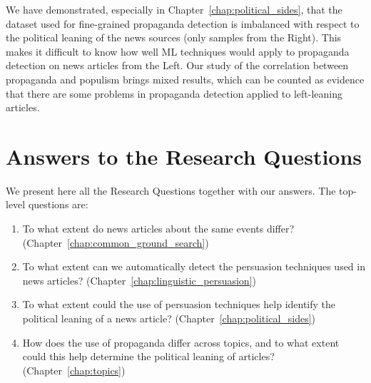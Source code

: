 \begin{enumerate}
          We have demonstrated, especially in Chapter~\ref{chap:political_sides}, that the dataset used for fine-grained propaganda detection is imbalanced with respect to the political leaning of the news sources (only samples from the Right). This makes it difficult to know how well ML techniques would apply to propaganda detection on news articles from the Left. Our study of the correlation between propaganda and populism brings mixed results, which can be counted as evidence that there are some problems in propaganda detection applied to left-leaning articles.
\end{enumerate}


\section{\statusgreen Answers to the Research Questions}
\label{sec:discussion_answers}

We present here all the Research Questions together with our answers. The top-level questions are:

\begin{enumerate}[label={\textbf{RQ\arabic*:}},leftmargin=1.6cm]
    \item To what extent do news articles about the same events differ? (Chapter~\ref{chap:common_ground_search})
    \item To what extent can we automatically detect the persuasion techniques used in news articles? (Chapter~\ref{chap:linguistic_persuasion})
    \item To what extent could the use of persuasion techniques help identify the political leaning of a news article? (Chapter~\ref{chap:political_sides})
    \item How does the use of propaganda differ across topics, and to what extent could this help determine the political leaning of articles? (Chapter~\ref{chap:topics})
\end{enumerate}


